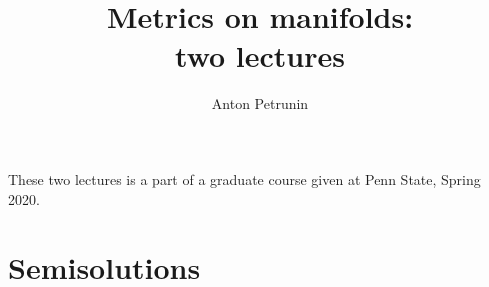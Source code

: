 \documentclass[twoside]{book}
\begin{document}
 
\title{Metrics on manifolds:
\\ two lectures}
\author{Anton Petrunin}
\date{}
\maketitle

These two lectures is a part of a graduate course given at Penn State, Spring 2020.

\thispagestyle{empty}
\tableofcontents
\thispagestyle{empty}

%



%
%
%
\appendix
\chapter{Semisolutions}


%
{\small\sloppy


\printbibliography[heading=bibintoc]
\fussy
}
\end{document}
